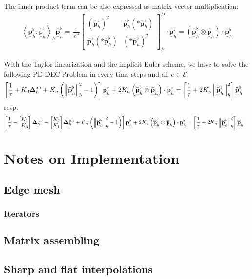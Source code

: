 \documentclass[a4paper,11pt]{scrartcl}
\newcommand{\pflhOld}{\widehat{\mathbf{p}}^{\flat}_{h}}
\newcommand{\PDpflh}{\underline{\mathbf{p}}^{\flat}_{h}}
\newcommand{\PDpflhOld}{\underline{\widehat{\mathbf{p}}}^{\flat}_{h}}
\newcommand{\PDphOld}{\underline{\widehat{\mathbf{p}}}_{h}}
\newcommand{\LB}{\boldsymbol{\Delta}^{\text{\tiny RR}}}
\newcommand{\LCB}{\boldsymbol{\Delta}^{\text{\tiny GD}}}
\newcommand{\LDR}{\boldsymbol{\Delta}^{\text{\tiny dR}}}
\newcommand{\LBh}{\LB_{h}}
\newcommand{\LCBh}{\LCB_{h}}
\newcommand{\LDRh}{\LDR_{h}}
\newcommand{\E}{\mathcal{E}}
\begin{document}
    The inner product term can be also expressed as matrix-vector multiplication:
    \begin{align}
      \left\langle \PDpflh, \PDpflhOld \right\rangle_{h}\PDpflhOld
        = \frac{1}{\left| e \right|^{2}}
            \begin{bmatrix}
              \left( \pflhOld \right)^{2} & \pflhOld\left( *\pflhOld  \right) \\
              \pflhOld\left( *\pflhOld  \right) & \left( * \pflhOld \right)^{2}
            \end{bmatrix}_{P}^{D} \cdot \PDpflh
        = \left( \PDpflhOld \otimes \PDphOld \right) \cdot \PDpflh
    \end{align}

    With the Taylor linearization and the implicit Euler scheme, we have to solve the following PD-DEC-Problem in every time steps and all \( e\in\E \)
    \begin{align}
      \left[ \frac{1}{\tau} + K_{0}\LDRh + K_{n}\left( \left\| \PDpflhOld \right\|_{h}^{2} - 1 \right) \right]\PDpflh
          + 2K_{n} \left( \PDpflhOld \otimes \PDphOld \right) \cdot \PDpflh
          &= \left[\frac{1}{\tau} + 2K_{n}\left\| \PDpflhOld \right\|_{h}^{2}\right]\PDpflhOld
    \end{align}
    resp.
    \begin{align} 
      \left[ \frac{1}{\tau}
          - \begin{bmatrix}
               K_{1} \\ K_{3}
            \end{bmatrix} \LCBh
            -\begin{bmatrix}
               K_{3} \\ K_{1}
            \end{bmatrix} \LBh
          + K_{n}\left( \left\| \PDpflhOld \right\|_{h}^{2} - 1 \right) \right]\PDpflh
          + 2K_{n} \left( \PDpflhOld \otimes \PDphOld \right) \cdot \PDpflh
          &= \left[\frac{1}{\tau} + 2K_{n}\left\| \PDpflhOld \right\|_{h}^{2}\right]\PDpflhOld
    \end{align}

    
\section{Notes on Implementation}

  \subsection{Edge mesh}

    \subsubsection{Iterators}

  \subsection{Matrix assembling}

  \subsection{Sharp and flat interpolations}



  



\end{document}
